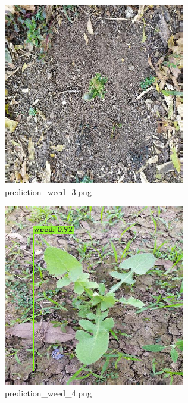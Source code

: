 \documentclass[12pt]{exam}
\begin{document}
\begin{questions}
\begin{parts}
		\hfill

		\begin{figure}[H]
			\includegraphics[width=\textwidth]{images-yolo/prediction_weed_3.png}
			\caption{prediction\_weed\_3.png}
		\end{figure}

		\hfill

		\begin{figure}[H]
			\includegraphics[width=\textwidth]{images-yolo/prediction_weed_4.png}
			\caption{prediction\_weed\_4.png}
		\end{figure}


\end{parts}
\end{questions}
\end{document}
